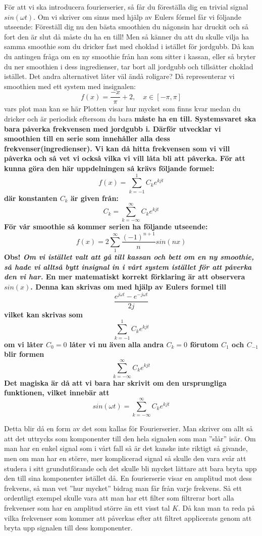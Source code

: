 \documentclass{article}
\begin{document}
För att vi ska introducera fourierserier, så får du föreställa dig en trivial signal $sin(\omega t)$. Om vi skriver om sinus med hjälp av Eulers fórmel får vi följande utseende:
Föreställ dig nu den bästa smoothien du någonsin har druckit och så fort den är slut då måste du ha en till! Men så känner du att du skulle vilja ha samma smoothie som du dricker fast med choklad i istället för jordgubb. Då kan du antingen fråga om en ny smoothie från han som sitter i kassan, eller så bryter du ner smoothien i dess ingredienser, tar bort all jordgubb och tillsätter choklad istället. Det andra alternativet låter väl ändå roligare? 
Då representerar vi smoothien med ett system med insignalen:
$$ f(x) = \frac{-x}{\pi} + 2, \quad x \in [-\pi,\pi] $$
vars plot man kan se här %
Plotten visar hur mycket som finns kvar medan du dricker och är periodisk eftersom du bara \bf{måste} ha en till. Systemsvaret ska bara påverka frekvensen med jordgubb i. Därför utvecklar vi smoothien till en serie som innehåller alla dess frekvenser(ingredienser). Vi kan då hitta frekvensen som vi vill påverka och så vet vi också vilka vi vill låta bli att påverka. För att kunna göra den här uppdelningen så krävs följande formel:
$$ f(x) = \sum_{k=-1}^1 C_k e^{k j t} $$
där konstanten $C_k$ är given från:
$$C_k = \sum_{k=-\infty}^{\infty} C_k e^{k j t}$$
För vår smoothie så kommer serien ha följande utseende:
$$f(x) = 2 \sum_{1}^{\infty} \frac{(-1)^{n+1}}{n} sin(n x) $$
Obs! \emph{Om vi istället valt att gå till kassan och bett om en ny smoothie, så hade vi alltså bytt insignal in i vårt system istället för att påverka den vi har.}
\newline
En mer matematiskt korrekt förklaring är att observera $sin(x)$. Denna kan skrivas om med hjälp av Eulers formel till 
$$ \frac{e^{j \omega t} - e^{-j \omega t}}{2j}$$
vilket kan skrivas som
$$ \sum_{k=-1}^1 C_k e^{k j t} $$
om vi låter $C_0 = 0$ låter vi nu även \bf{alla} andra $C_k = 0$ förutom  $C_1$ och $C_{-1}$ blir formen
$$ \sum_{k=-\infty}^{\infty} C_k e^{k j t} $$
Det magiska är då att vi bara har skrivit om den ursprungliga funktionen, vilket innebär att 
$$ sin(\omega t) = \sum_{k=-\infty}^{\infty} C_k e^{k j t} $$

Detta blir då en form av det som kallas för Fourierserier. Man skriver om allt så att det uttrycks som komponenter till den hela signalen som man ''slår'' isär. Om man har en enkel signal som i vårt fall så är det kanske inte riktigt så givande, men om man har en större, mer komplicerad signal så skulle den vara svår att studera i sitt grundutförande och det skulle bli mycket lättare att bara bryta upp den till sina komponenter istället då. \newline
En fourierserie visar en amplitud mot dess frekvens, så man vet ''hur mycket'' bidrag man får från varje frekvens. Så ett ordentligt exempel skulle vara att man har ett filter som filtrerar bort alla frekvenser som har en amplitud större än ett visst tal $K$. Då kan man ta reda på vilka frekvenser som kommer att påverkas efter att filtret applicerats genom att bryta upp signalen till dess komponenter. \newline
\end{document}
